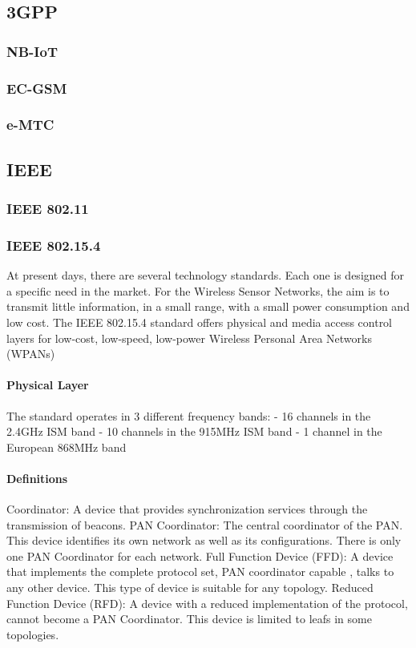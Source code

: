\subsection{3GPP}
\subsubsection{NB-IoT}
\subsubsection{EC-GSM}
\subsubsection{e-MTC}


\subsection{IEEE}
\subsubsection{IEEE 802.11}



\subsubsection{IEEE 802.15.4}
At present days,
	there are several technology standards.
Each one is designed for a specific need in the market.
For the Wireless Sensor Networks,
	the aim is to transmit little information,
	in a small range,
	with a small power consumption and low cost.
The IEEE 802.15.4 standard offers physical and media access control layers for low-cost,
	low-speed,
	low-power Wireless Personal Area Networks (WPANs)

\paragraph{Physical Layer}
The standard operates in 3 different frequency bands:
- 16 channels in the 2.4GHz ISM band
- 10 channels in the 915MHz ISM band
- 1 channel in the European 868MHz band


\paragraph{Definitions}
Coordinator:
	A device that provides synchronization services through the transmission of beacons.
PAN Coordinator:
	The central coordinator of the PAN.
This device identifies its own network as well as its configurations.
There is only one PAN Coordinator for each network.
Full Function Device (FFD):
	A device that implements the complete protocol set,
	PAN coordinator capable ,
	talks to any other device.
This type of device is suitable for any topology.
Reduced Function Device (RFD):
	A device with a reduced implementation of the protocol,
	cannot become a PAN Coordinator.
This device is limited to leafs in some topologies.

